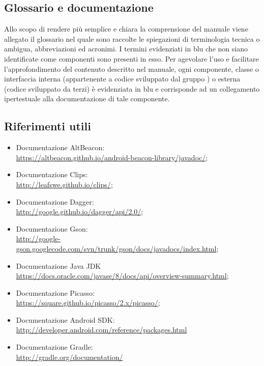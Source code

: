 \documentclass[../ManualeSviluppatore.tex]{subfiles}
\begin{document}
	\subsection{Glossario e documentazione}
		Allo scopo di rendere più semplice e chiara la comprensione del manuale
viene allegato il glossario nel quale sono raccolte le spiegazioni di
terminologia tecnica o ambigua, abbreviazioni ed acronimi. I termini evidenziati in blu che non siano identificate come componenti sono presenti in esso.
		Per agevolare l'uso e facilitare l'approfondimento del contenuto descritto nel manuale, ogni componente, classe o interfaccia interna (appartenente a codice sviluppato dal gruppo \leaf) o esterna (codice sviluppato da terzi) è evidenziata in blu e corrisponde ad un collegamento ipertestuale alla documentazione di tale componente.
	
	
	\subsection{Riferimenti utili}
		\begin{itemize}
			\item Documentazione \gls{AltBeacon}: \\ \url{https://altbeacon.github.io/android-beacon-library/javadoc/};
			\item Documentazione Clips: \\ \url{http://leafswe.github.io/clips/};
			\item Documentazione Dagger: \\ \url{http://google.github.io/dagger/api/2.0/};
			\item Documentazione Gson: \\ \url{http://google-gson.googlecode.com/svn/trunk/gson/docs/javadocs/index.html};
			\item Documentazione \gls{Java} JDK \\ \url{https://docs.oracle.com/javase/8/docs/api/overview-summary.html};
			\item Documentazione Picasso: \\ \url{https://square.github.io/picasso/2.x/picasso/};
			\item Documentazione \gls{Android} SDK: \\ \url{http://developer.android.com/reference/packages.html}

			\item Documentazione Gradle: \\ \url{http://gradle.org/documentation/}			

		\end{itemize}
\end{document}
